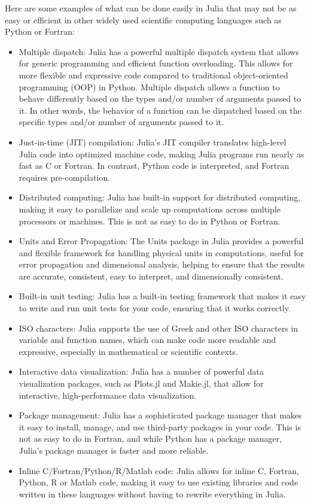 Here are some examples of what can be done easily in Julia that may not be as easy or efficient in other widely used scientific computing languages such as Python or Fortran:
\begin{itemize}
\item Multiple dispatch: Julia has a powerful multiple dispatch system that allows for generic programming and efficient function overloading. This allows for more flexible and expressive code compared to traditional object-oriented programming (OOP) in Python. Multiple dispatch allows a function to behave differently based on the types and/or number of arguments passed to it. In other words, the behavior of a function can be dispatched based on the specific types and/or number of arguments passed to it.
\item Just-in-time (JIT) compilation: Julia's JIT compiler translates high-level Julia code into optimized machine code, making Julia programs run nearly as fast as C or Fortran. In contrast, Python code is interpreted, and Fortran requires pre-compilation.
\item Distributed computing: Julia has built-in support for distributed computing, making it easy to parallelize and scale up computations across multiple processors or machines. This is not as easy to do in Python or Fortran.
\item Units and Error Propagation: The Units package in Julia provides a powerful and flexible framework for handling physical units in computations, useful for error propagation and dimensional analysis, helping to ensure that the results are accurate, consistent, easy to interpret, and dimensionally consistent.
\item Built-in unit testing: Julia has a built-in testing framework that makes it easy to write and run unit tests for your code, ensuring that it works correctly.
\item ISO characters: Julia supports the use of Greek and other ISO characters in variable and function names, which can make code more readable and expressive, especially in mathematical or scientific contexts.
\item Interactive data visualization: Julia has a number of powerful data visualization packages, such as Plots.jl and Makie.jl, that allow for interactive, high-performance data visualization.
\item Package management: Julia has a sophisticated package manager that makes it easy to install, manage, and use third-party packages in your code. This is not as easy to do in Fortran, and while Python has a package manager, Julia's package manager is faster and more reliable.
\item Inline C/Fortran/Python/R/Matlab code: Julia allows for inline C, Fortran, Python, R or Matlab code, making it easy to use existing libraries and code written in these languages without having to rewrite everything in Julia.
\end{itemize}



